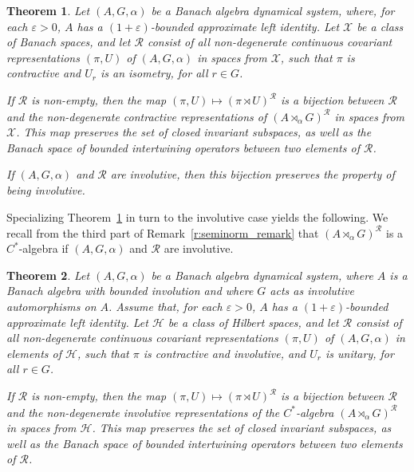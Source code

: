 \documentclass{amsart}
\theoremstyle{plain}
\newtheorem{theorem}{Theorem}[section]
\theoremstyle{definition}
\numberwithin{equation}{section}
\begin{document}
\begin{theorem}\label{t:isometry_correspondence}
Let ${(A,G,\alpha)}$ be a Banach algebra dynamical system, where, for each ${\varepsilon} >0$, $A$ has a $(1+{\varepsilon})$-bounded approximate left identity. Let ${\mathcal X}$ be a class of Banach spaces, and let ${\mathcal R}$ consist of all non-degenerate continuous covariant representations ${(\pi,U)}$ of ${(A,G,\alpha)}$ in spaces from ${\mathcal X}$, such that $\pi$ is contractive and $U_r$ is an isometry, for all $r\in G$.

If ${\mathcal R}$ is non-empty, then the map ${(\pi,U)} \mapsto ({\pi \rtimes U})^{\mathcal R}$ is a bijection between ${\mathcal R}$ and the non-degenerate contractive representations of ${(A {\rtimes}_\alpha G)^\mathcal{R}}$ in spaces from ${\mathcal X}$. This map preserves the set of closed invariant subspaces, as well as the Banach space of bounded intertwining operators between two elements of ${\mathcal R}$.

If ${(A,G,\alpha)}$ and ${\mathcal R}$ are involutive, then this bijection preserves the property of being involutive.
\end{theorem}

Specializing Theorem~\ref{t:isometry_correspondence} in turn to the involutive case yields the following. We recall from the third part of Remark~\ref{r:seminorm_remark} that ${(A {\rtimes}_\alpha G)^\mathcal{R}}$ is a $C^*$-algebra if ${(A,G,\alpha)}$ and ${\mathcal R}$ are involutive.

\begin{theorem}\label{t:involutive_correspondence}
Let ${(A,G,\alpha)}$ be a Banach algebra dynamical system, where $A$ is a Banach algebra with bounded involution and where $G$ acts as involutive automorphisms on $A$. Assume that, for each ${\varepsilon} >0$, $A$ has a $(1+{\varepsilon})$-bounded approximate left identity. Let $\mathcal H$ be a class of Hilbert spaces, and let ${\mathcal R}$ consist of all non-degenerate continuous covariant representations ${(\pi,U)}$ of ${(A,G,\alpha)}$ in elements of $\mathcal H$, such that $\pi$ is contractive and involutive, and $U_r$ is unitary, for all $r\in G$.

If ${\mathcal R}$ is non-empty, then the map ${(\pi,U)} \mapsto ({\pi \rtimes U})^{\mathcal R}$ is a bijection between ${\mathcal R}$ and the non-degenerate involutive representations of the $C^*$-algebra ${(A {\rtimes}_\alpha G)^\mathcal{R}}$ in spaces from $\mathcal H$. This map preserves the set of closed invariant subspaces, as well as the Banach space of bounded intertwining operators between two elements of ${\mathcal R}$.
\end{theorem}
\end{document}
